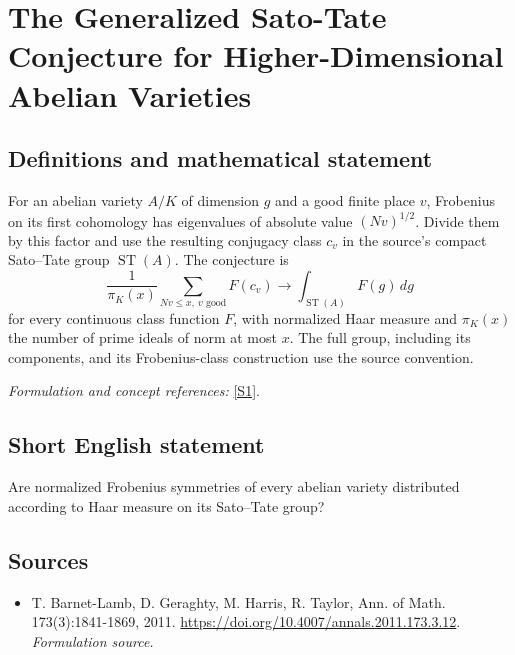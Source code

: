 \documentclass[11pt]{article}
\begin{document}
\section*{\texorpdfstring{The Generalized Sato-Tate Conjecture for Higher-Dimensional Abelian Varieties}{The Generalized Sato-Tate Conjecture for Higher-Dimensional Abelian Varieties}}\label{30006745}
\subsection{Definitions and mathematical statement}
For an abelian variety $A/K$ of dimension $g$ and a good finite place $v$, Frobenius on its first cohomology has eigenvalues of absolute value $(Nv)^{1/2}$. Divide them by this factor and use the resulting conjugacy class $c_v$ in the source's compact Sato--Tate group $\operatorname{ST}(A)$. The conjecture is
\[
 \frac1{\pi_K(x)}\sum_{Nv\le x,\ v\text{ good}}F(c_v)
 \longrightarrow\int_{\operatorname{ST}(A)}F(g)\,dg
\]
for every continuous class function $F$, with normalized Haar measure and $\pi_K(x)$ the number of prime ideals of norm at most $x$. The full group, including its components, and its Frobenius-class construction use the source convention.
\par\smallskip\textit{Formulation and concept references:} \href{https://doi.org/10.4007/annals.2011.173.3.12}{[S1]}.

\subsection{Short English statement}
Are normalized Frobenius symmetries of every abelian variety distributed according to Haar measure on its Sato--Tate group?
\subsection{Sources}
\begin{itemize}
\item[S1]T. Barnet-Lamb, D. Geraghty, M. Harris, R. Taylor, Ann. of Math. 173(3):1841-1869, 2011.
\url{https://doi.org/10.4007/annals.2011.173.3.12}.
\textit{Formulation source.}
\end{itemize}
\end{document}
